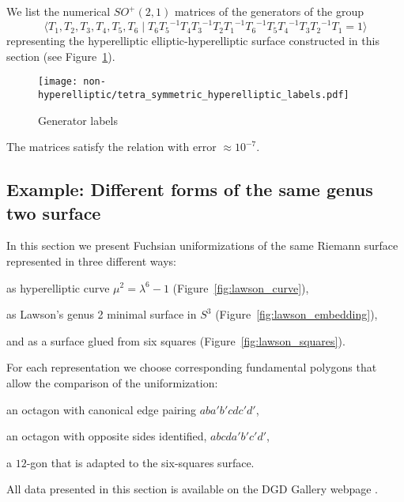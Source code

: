 \documentclass[Thesis]{subfiles}
\begin{document}
We list the numerical $SO^{+}(2,1)$ matrices of the generators of the
group
\begin{equation}
  \label{eq:T-relation}
  \langle T_1,T_2,T_3,T_4,T_5,T_6 \mid
  T_{6}{T_{5}}^{-1}T_{4}{T_{3}}^{-1}T_{2}{T_{1}}^{-1}{T_{6}}^{-1}T_{5}{T_{4}}^{-1}T_{3}{T_{2}}^{-1}T_{1}=1
  \rangle
\end{equation}
representing the hyperelliptic elliptic-hyperelliptic surface
constructed in this section (see Figure~\ref{fig:elliptic-hyperelliptic-data}).
\begin{figure}[tb]
\centering
\texttt{[image: non-hyperelliptic/tetra\_symmetric\_hyperelliptic\_labels.pdf]}
\caption{Generator labels}
\label{fig:elliptic-hyperelliptic-data}
\end{figure}
The matrices satisfy the relation with error $\approx 10^{-7}$.



\subsection{Example: Different forms of the same genus two surface}
\label{sec:lawson_uniformization}

In this section we present Fuchsian uniformizations of the same
Riemann surface represented in three different ways:
\begin{compactitem}
\item 
  as hyperelliptic curve $\mu^2=\lambda^6-1$
  (Figure~\ref{fig:lawson_curve}),
\item as Lawson's genus 2 minimal surface
  in $S^3$ \cite{Law1970} (Figure~\ref{fig:lawson_embedding}),
\item and as
  a surface glued from six squares (Figure~\ref{fig:lawson_squares}).
\end{compactitem}
For each representation we choose corresponding fundamental polygons
that allow the comparison of the uniformization:
\begin{compactitem}
\item an octagon with canonical edge pairing $aba'b'cdc'd'$,
\item an octagon with opposite sides identified, $abcda'b'c'd'$,
\item a $12$-gon that is adapted to the six-squares surface. 
\end{compactitem}
All data presented
in this section is available on the {DGD Gallery} webpage
\cite{gallery-lawson-webpage}.
\end{document}
